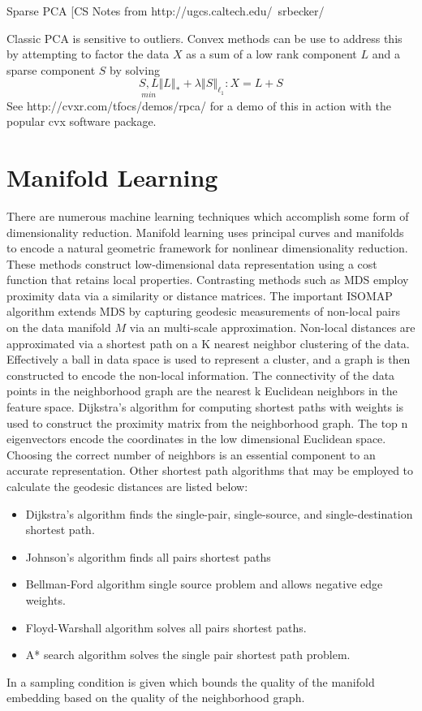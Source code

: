 \documentclass[a4paper]{article}
\newcommand{\norm}[1]{\left\Vert#1\right\Vert}
\theoremstyle{plain}
\theoremstyle{definition}
\theoremstyle{remark}
\numberwithin{equation}{section}
\begin{document}
Sparse PCA
[CS Notes from http://ugcs.caltech.edu/~srbecker/

Classic PCA is sensitive to outliers.  Convex methods can be use to address this by attempting to factor the data $X$ as a sum of a low rank component $L$ and a sparse component $S$ by solving
\begin{equation*}
\underset{min}{S,L} \norm{L}_* + \lambda \norm{S}_{\ell_1}  : X=L+S
\end{equation*}
See http://cvxr.com/tfocs/demos/rpca/ for a demo of this in action with the popular cvx software package.


\section{Manifold Learning}
There are numerous machine learning techniques which accomplish some form of dimensionality reduction.
Manifold learning uses principal curves and manifolds to encode a natural geometric framework for nonlinear dimensionality reduction.  These methods construct low-dimensional data representation using a cost function that retains local properties.
Contrasting methods such as MDS employ proximity data via a similarity or distance matrices.  The important ISOMAP \cite{MDS_ISOMAP}algorithm extends MDS by capturing geodesic measurements of non-local pairs on the data manifold $M$ via an multi-scale approximation.  Non-local distances are approximated via a shortest path on a K nearest neighbor clustering of the data.  Effectively a ball in data space is used to represent a cluster, and a graph is then constructed to encode the non-local information.  The connectivity of the data points in the neighborhood graph are the nearest k Euclidean neighbors in the feature space.  Dijkstra's algorithm for computing shortest paths with weights is used to construct the proximity matrix from the neighborhood graph.  The top n eigenvectors encode the coordinates in the low dimensional Euclidean space.  Choosing the correct number of neighbors is an essential component to an accurate representation.
Other shortest path algorithms that may be employed to calculate the geodesic distances are listed below:
\begin{itemize}
  \item Dijkstra's algorithm finds the single-pair, single-source, and single-destination shortest path.
  \item Johnson's algorithm finds all pairs shortest paths
  \item Bellman-Ford algorithm single source problem and allows negative edge weights.
  \item Floyd-Warshall algorithm solves all pairs shortest paths.
  \item A* search algorithm solves the single pair shortest path problem.
\end{itemize}
In \cite{MDSBernstein00graphapproximations} a sampling condition is given which bounds the quality of the manifold embedding based on the quality of the neighborhood graph.
\end{document}
